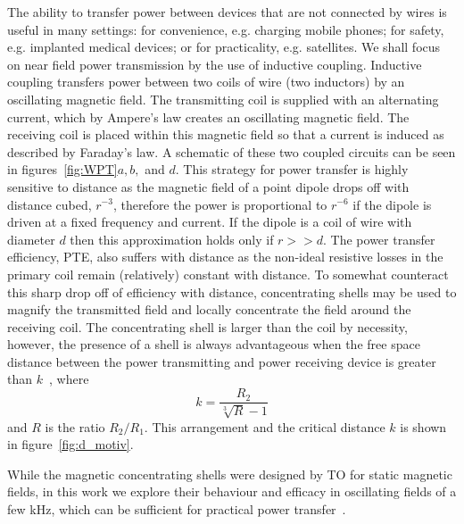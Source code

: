 \documentclass[11pt]{iopart}
\begin{document}
The ability to transfer power between devices that are not connected
by wires is useful in many settings: for convenience, e.g. charging mobile
phones; for safety, e.g. implanted medical devices; or for
practicality, e.g. satellites. We shall focus on near field power
transmission by the use of inductive coupling. Inductive coupling
transfers power between two coils of wire (two inductors) by an
oscillating magnetic field.  The transmitting coil is supplied with an
alternating current, which by Ampere's law creates an oscillating
magnetic field. The receiving coil is placed within this magnetic
field so that a current is induced as described by Faraday's law. A
schematic of these two coupled circuits can be seen in
figures~\ref{fig:WPT}$a, b,$ and $d$. This strategy for power transfer
is highly sensitive to distance as the magnetic field of a point dipole
drops off with distance cubed, $r^{-3}$, therefore the power is
proportional to $r^{-6}$ if the dipole is driven at a fixed frequency
and current. If the dipole is a coil of wire with diameter $d$ then
this approximation holds only if $r>>d$.  The power transfer
efficiency, PTE, also suffers with
distance as the non-ideal resistive losses in the primary coil remain
(relatively) constant with distance. To somewhat counteract this sharp
drop off of efficiency with distance, concentrating shells may be used
to magnify the transmitted field and locally concentrate the field
around the receiving coil. The concentrating shell is larger than
the coil by necessity, however, the presence of a shell is always
advantageous when the free space distance between the power
transmitting and power receiving device is greater than $k$~\cite{Prat2016}, where
\vspace{-0.2em}
\begin{equation}
k = \frac{R_2}{\sqrt[3]{R}-1}
\end{equation}
\vspace{-0.2em}
and $R$ is the ratio $R_2/R_1$. This arrangement and the critical
distance $k$ is shown in figure~\ref{fig:d_motiv}.

While the magnetic concentrating shells were designed by TO for static
magnetic fields, in this work we explore their behaviour and efficacy in
oscillating fields of a few kHz, which can be sufficient for practical
power transfer~\cite{Wang2005}.


\end{document}
